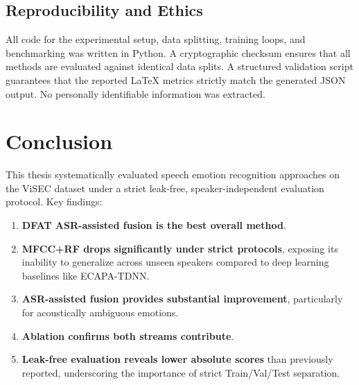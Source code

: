 \documentclass[12pt,a4paper]{report}
\begin{document}
\section{Reproducibility and Ethics}
All code for the experimental setup, data splitting, training loops, and benchmarking was written in Python. A cryptographic checksum ensures that all methods are evaluated against identical data splits. A structured validation script guarantees that the reported LaTeX metrics strictly match the generated JSON output. No personally identifiable information was extracted.

\chapter{Conclusion}
This thesis systematically evaluated speech emotion recognition approaches on the ViSEC dataset under a strict leak-free, speaker-independent evaluation protocol. Key findings:
\begin{enumerate}
    \item \textbf{DFAT ASR-assisted fusion is the best overall method}.
    \item \textbf{MFCC+RF drops significantly under strict protocols}, exposing its inability to generalize across unseen speakers compared to deep learning baselines like ECAPA-TDNN.
    \item \textbf{ASR-assisted fusion provides substantial improvement}, particularly for acoustically ambiguous emotions.
    \item \textbf{Ablation confirms both streams contribute}.
    \item \textbf{Leak-free evaluation reveals lower absolute scores} than previously reported, underscoring the importance of strict Train/Val/Test separation.
\end{enumerate}



\end{document}
